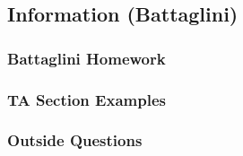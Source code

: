 \documentclass[12pt]{article}
\begin{document}
\subsection{Information (Battaglini)}

\subsubsection{Battaglini Homework}

\subsubsection{TA Section Examples}

\subsubsection{Outside Questions}
\end{document}

